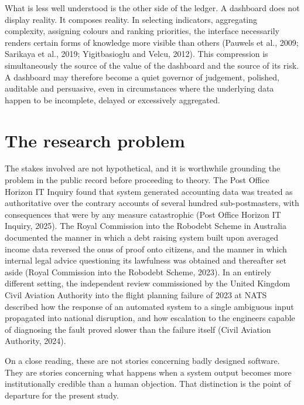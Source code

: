 \documentclass[12pt,a4paper]{article}
\begin{document}
What is less well understood is the other side of the ledger. A dashboard does not display reality. It
composes reality. In selecting indicators, aggregating complexity, assigning colours and ranking
priorities, the interface necessarily renders certain forms of knowledge more visible than others (Pauwels
et al., 2009; Sarikaya et al., 2019; Yigitbasioglu and Velcu, 2012). This compression is simultaneously the
source of the value of the dashboard and the source of its risk. A dashboard may therefore become a quiet
governor of judgement, polished, auditable and persuasive, even in circumstances where the underlying data
happen to be incomplete, delayed or excessively aggregated.

\section{The research problem}

The stakes involved are not hypothetical, and it is worthwhile grounding the problem in the public record
before proceeding to theory. The Post Office Horizon IT Inquiry found that system generated accounting data
was treated as authoritative over the contrary accounts of several hundred sub-postmasters, with
consequences that were by any measure catastrophic (Post Office Horizon IT Inquiry, 2025). The Royal
Commission into the Robodebt Scheme in Australia documented the manner in which a debt raising system built
upon averaged income data reversed the onus of proof onto citizens, and the manner in which internal legal
advice questioning its lawfulness was obtained and thereafter set aside (Royal Commission into the Robodebt
Scheme, 2023). In an entirely different setting, the independent review commissioned by the United Kingdom
Civil Aviation Authority into the flight planning failure of 2023 at NATS described how the response of an
automated system to a single ambiguous input propagated into national disruption, and how escalation to the
engineers capable of diagnosing the fault proved slower than the failure itself (Civil Aviation Authority,
2024).

On a close reading, these are not stories concerning badly designed software. They are stories concerning
what happens when a system output becomes more institutionally credible than a human objection. That
distinction is the point of departure for the present study.
\end{document}
